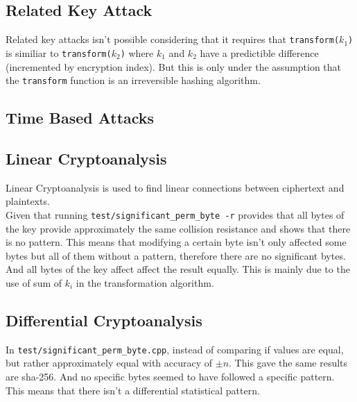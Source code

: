 \documentclass[fleqn, a4paper,12pt]{article}
\begin{document}
\subsection{Related Key Attack}

Related key attacks isn't possible considering that it requires that \texttt{transform($k_1$)} is similiar to \texttt{transform($k_2$)} where $k_1$ and $k_2$ have a predictible difference (incremented by encryption index). But this is only under the assumption that the \texttt{transform} function is an irreversible hashing algorithm.

\subsection{Time Based Attacks}



\subsection{Linear Cryptoanalysis}

Linear Cryptoanalysis is used to find linear connections between ciphertext and plaintexts.
\\
Given that running \texttt{test/significant\_perm\_byte -r} provides that all bytes of the key provide approximately the same collision resistance and shows that there is no pattern. This means that modifying a certain byte isn't only affected some bytes but all of them without a pattern, therefore there are no significant bytes. And all bytes of the key affect affect the result equally. This is mainly due to the use of sum of $k_i$ in the transformation algorithm. 

\subsection{Differential Cryptoanalysis}

In \texttt{test/significant\_perm\_byte.cpp}, instead of comparing if values are equal, but rather approximately equal with accuracy of $\pm n$. This gave the same results are sha-256. And no specific bytes seemed to have followed a specific pattern. This means that there isn't a differential statistical pattern.
\end{document}
